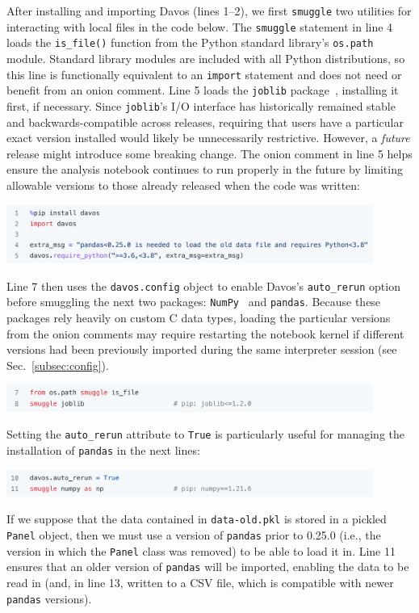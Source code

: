 \documentclass[preprint,12pt,a4paper]{elsarticle}
\begin{document}
After installing and importing Davos (lines 1--2), we first \texttt{smuggle} two
utilities for interacting with local files in the code below. The
\texttt{smuggle} statement in line 4 loads the \texttt{is\_file()}
function from the Python standard library's \texttt{os.path}
module. Standard library modules are included with all Python
distributions, so this line is functionally equivalent to an
\texttt{import} statement and does not need or benefit from an onion
comment. Line 5 loads the \texttt{joblib} package~\cite{Varo10},
installing it first, if necessary. Since \texttt{joblib}'s I/O
interface has historically remained stable and backwards-compatible
across releases, requiring that users have a particular exact version
installed would likely be unnecessarily restrictive. However, a
\textit{future} release might introduce some breaking change.  The
onion comment in line 5 helps ensure the analysis notebook continues
to run properly in the future by limiting allowable versions to those
already released when the code was written:
\begin{center}
\includegraphics[width=0.9\textwidth]{figs/example1}
\end{center}
Line 7 then uses the \texttt{davos.config} object to enable
Davos's \texttt{auto\_rerun} option before smuggling the next
two packages: \texttt{NumPy}~\cite{HarrEtal20} and
\texttt{pandas}. Because these packages rely heavily on custom C data
types, loading the particular versions from the onion comments may
require restarting the notebook kernel if different versions had been previously
imported during the same interpreter session (see
Sec.~\ref{subsec:config}).
\begin{center}
\includegraphics[width=0.9\textwidth]{figs/example2}
\end{center}
Setting the \texttt{auto\_rerun} attribute to \texttt{True} is particularly useful
for managing the installation of \texttt{pandas} in the next
lines:
\begin{center}
\includegraphics[width=0.9\textwidth]{figs/example3}
\end{center}
If we suppose that the data contained in \texttt{data-old.pkl} is
stored in a pickled \texttt{Panel} object, then we must use a version of
\texttt{pandas} prior to 0.25.0 (i.e., the version in which the \texttt{Panel}
class was removed) to be able to load it in. Line 11 ensures
that an older version of \texttt{pandas} will be imported, enabling
the data to be read in (and, in line 13, written to a CSV
file, which is compatible with newer \texttt{pandas} versions).
\end{document}
